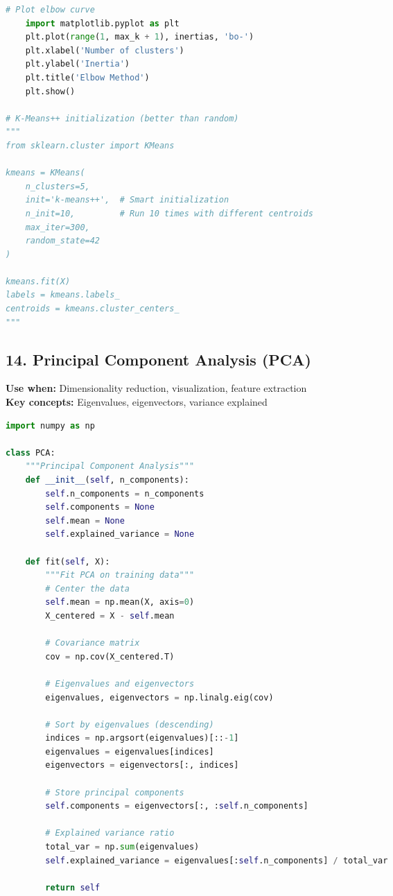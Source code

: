 \documentclass[8pt,landscape]{article}
\begin{document}
\begin{multicols}{3}
\begin{lstlisting}[language=Python]
    # Plot elbow curve
    import matplotlib.pyplot as plt
    plt.plot(range(1, max_k + 1), inertias, 'bo-')
    plt.xlabel('Number of clusters')
    plt.ylabel('Inertia')
    plt.title('Elbow Method')
    plt.show()

# K-Means++ initialization (better than random)
"""
from sklearn.cluster import KMeans

kmeans = KMeans(
    n_clusters=5,
    init='k-means++',  # Smart initialization
    n_init=10,         # Run 10 times with different centroids
    max_iter=300,
    random_state=42
)

kmeans.fit(X)
labels = kmeans.labels_
centroids = kmeans.cluster_centers_
"""
\end{lstlisting}

\subsection*{14. Principal Component Analysis (PCA)}
\textbf{Use when:} Dimensionality reduction, visualization, feature extraction \\
\textbf{Key concepts:} Eigenvalues, eigenvectors, variance explained
\begin{lstlisting}[language=Python]
import numpy as np

class PCA:
    """Principal Component Analysis"""
    def __init__(self, n_components):
        self.n_components = n_components
        self.components = None
        self.mean = None
        self.explained_variance = None

    def fit(self, X):
        """Fit PCA on training data"""
        # Center the data
        self.mean = np.mean(X, axis=0)
        X_centered = X - self.mean

        # Covariance matrix
        cov = np.cov(X_centered.T)

        # Eigenvalues and eigenvectors
        eigenvalues, eigenvectors = np.linalg.eig(cov)

        # Sort by eigenvalues (descending)
        indices = np.argsort(eigenvalues)[::-1]
        eigenvalues = eigenvalues[indices]
        eigenvectors = eigenvectors[:, indices]

        # Store principal components
        self.components = eigenvectors[:, :self.n_components]

        # Explained variance ratio
        total_var = np.sum(eigenvalues)
        self.explained_variance = eigenvalues[:self.n_components] / total_var

        return self


\end{lstlisting}
\end{multicols}
\end{document}
